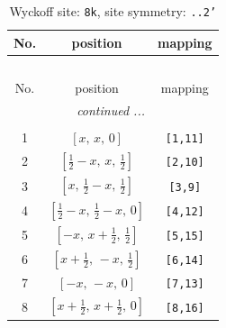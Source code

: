 \documentclass[fleqn,8pt]{jsarticle}
\begin{document}
\begin{longtable}{ccc}
\caption{Wyckoff site: {\tt 8k}, site symmetry: {\tt ..2'}}
 \\
 \hline \hline
No. & position & mapping \\ \hline \endfirsthead

\multicolumn{2}{l}{\tablename\ \thetable{}} \\
 \hline \hline
No. & position & mapping \\ \hline \endhead

 \hline \hline
\multicolumn{2}{r}{\footnotesize\it continued ...} \\ \endfoot

 \hline \hline
\multicolumn{2}{r}{} \\ \endlastfoot

1 & $\left[ x,\, x,\, 0 \right]$ & {\tt [1,11]} \\ \hline
2 & $\left[ \frac{1}{2} - x,\, x,\, \frac{1}{2} \right]$ & {\tt [2,10]} \\ \hline
3 & $\left[ x,\, \frac{1}{2} - x,\, \frac{1}{2} \right]$ & {\tt [3,9]} \\ \hline
4 & $\left[ \frac{1}{2} - x,\, \frac{1}{2} - x,\, 0 \right]$ & {\tt [4,12]} \\ \hline
5 & $\left[ - x,\, x + \frac{1}{2},\, \frac{1}{2} \right]$ & {\tt [5,15]} \\ \hline
6 & $\left[ x + \frac{1}{2},\, - x,\, \frac{1}{2} \right]$ & {\tt [6,14]} \\ \hline
7 & $\left[ - x,\, - x,\, 0 \right]$ & {\tt [7,13]} \\ \hline
8 & $\left[ x + \frac{1}{2},\, x + \frac{1}{2},\, 0 \right]$ & {\tt [8,16]} \\
\end{longtable}
\renewcommand{\arraystretch}{1.2}
\end{document}
